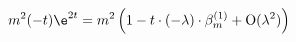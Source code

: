 \begin{equation}
m^2 (-t) \e^{2t} = m^2 \left( 1 - t \cdot (-\lambda) \cdot \beta_m^{(1)} +
\text{O} (\lambda^2) \right)
\end{equation}

